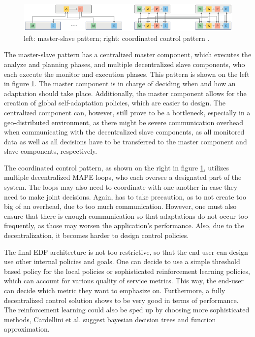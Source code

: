         \begin{figure}[hbt]
            \centering
            \includegraphics[width=1.0\textwidth]{Bilder/master_coordinated.png}
            \caption{
                    left: master-slave pattern; right: coordinated control pattern \cite{cardellini}.
            }
            \label{fig:master_coordinated}
        \end{figure}

        \quad The master-slave pattern has a centralized master component, which executes the analyze and planning phases, and multiple decentralized slave components, 
        who each execute the monitor and execution phases. This pattern is shown on the left in figure \ref{fig:master_coordinated}.
        The master component is in charge of deciding when and how an adaptation should take place.
        Additionally, the master component allows for the creation of global self-adaptation policies, which are easier to design.
        The centralized component can, however, still prove to be a bottleneck, especially in a geo-distributed environment, as there might be severe communication overhead when communicating 
        with the decentralized slave components, as all monitored data as well as all decisions have to be transferred to the master component and slave components, respectively. 

        \quad The coordinated control pattern, as shown on the right in figure \ref{fig:master_coordinated}, utilizes multiple decentralized MAPE loops, who each oversee a designated part of the system. 
        The loops may also need to coordinate with one another in case they need to make joint decisions. Again, has to take precaution, as to not create too big of an overhead, due to too much communication.
        However, one must also ensure that there is enough communication so that adaptations do not occur too frequently, as those may worsen the application's performance.
        Also, due to the decentralization, it becomes harder to design control policies.
        
        \quad The final EDF architecture is not too restrictive, so that the end-user can design use other internal policies and goals. 
        One can decide to use a simple threshold based policy for the local policies or sophisticated reinforcement learning policies, which can account for various 
        quality of service metrics. This way, the end-user can decide which metric they want to emphasize on.
        Furthermore, a fully decentralized control solution shows to be very good in terms of performance.
        The reinforcement learning could also be sped up by choosing more sophisticated methods, Cardellini et al. suggest bayesian decision trees and function approximation.

